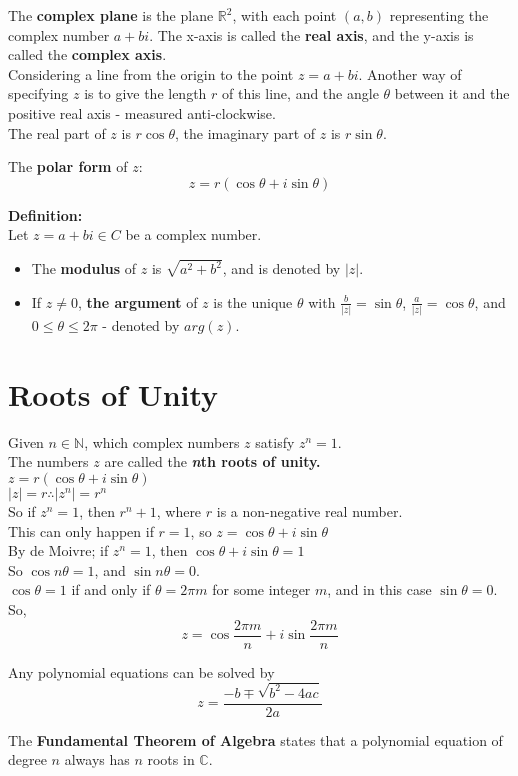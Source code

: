 \documentclass{report}
\newenvironment{frameblue}[1][BlueViolet]
  {\begin{tcolorbox}[colframe=#1,colback=white]}
  {\end{tcolorbox}}
\begin{document}
The \textbf{complex plane} is the plane $\mathbb{R}^2$, with each point $(a,b)$ representing the complex number $a + bi$. The x-axis is called the \textbf{real axis}, and the y-axis is called the \textbf{complex axis}.\\

Considering a line from the origin to the point $z = a + bi$. Another way of specifying $z$ is to give the length $r$ of this line, and the angle $\theta$ between it and the positive real axis - measured anti-clockwise.\\
The real part of $z$ is $r \cos{\theta}$,
the imaginary part of $z$ is $r \sin{\theta}$.\\

\begin{center}
    The \textbf{polar form }of $z$:
    \begin{equation}
        z = r(\cos{\theta} + i\sin{\theta})
    \end{equation}
\end{center}

\begin{frameblue}
    \textbf{Definition:}\\
    Let $z = a + bi \in C$ be a complex number.
    \begin{itemize}
        \item The \textbf{modulus} of $z$ is $\sqrt{a^2+b^2}$, and is denoted by $|z|$.
        \item If $z \neq 0$, \textbf{the argument} of $z$ is the unique $\theta$ with $\frac{b}{|z|} = \sin{\theta}$, $\frac{a}{|z|} = \cos{\theta}$, and $0 \leq \theta \leq 2\pi$ - denoted by $arg(z)$.
    \end{itemize}
\end{frameblue}

\section{Roots of Unity}

Given $n \in \mathbb{N}$, which complex numbers $z$ satisfy $z^n = 1$.\\
The numbers $z$ are called the \textbf{\textit{n}th roots of unity.}\\
$z = r(\cos{\theta}+i\sin{\theta})$\\
$|z| = r \therefore |z^n| = r^n$\\
So if $z^n = 1$, then $r^n+1$, where $r$ is a non-negative real number.\\
This can only happen if $r=1$, so $z = \cos{\theta} + i\sin{\theta}$\\
By de Moivre; if $z^n = 1$, then $\cos{\theta} + i\sin{\theta} = 1$\\
So $\cos{n\theta} = 1$, and $\sin{n\theta} = 0$.\\
$\cos{\theta} = 1$ if and only if $\theta = 2\pi m$ for some integer $m$, and in this case $\sin{\theta} = 0$. So,
\begin{equation*}
    z = \cos{\frac{2\pi m}{n}} + i\sin{\frac{2\pi m}{n}}
\end{equation*}

Any polynomial equations can be solved by
\begin{equation}
    z = \frac{-b \mp \sqrt{b^2-4ac}}{2a}
\end{equation}

The \textbf{Fundamental Theorem of Algebra} states that a polynomial equation of degree $n$ always has $n$ roots in $\mathbb{C}$.
\end{document}
